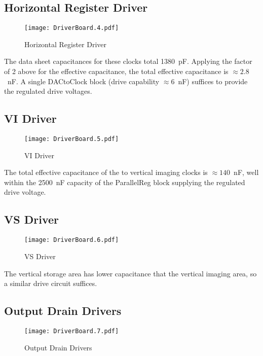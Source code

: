 \subsection{Horizontal Register Driver}
   \begin{figure}
   \begin{center}
   \texttt{[image: DriverBoard.4.pdf]}
   \end{center}
   \caption{Horizontal Register Driver}
   \end{figure}
   
The data sheet capacitances for these clocks total 1380\ pF. Applying the factor of 2 above for the effective capacitance, the total effective capacitance is $\approx 2.8$\ nF. A single DACtoClock block (drive capability $\approx 6$\ nF) suffices to provide the regulated drive voltages.
  


\subsection{VI Driver}
   \begin{figure}
   \begin{center}
   \texttt{[image: DriverBoard.5.pdf]}
   \end{center}
   \caption{VI Driver}
   \end{figure}

The total effective capacitance of the to vertical imaging clocks is $\approx 140$\ nF, well within the 2500\ nF capacity of the ParallelReg block supplying the regulated drive voltage.


\subsection{VS Driver}
   \begin{figure}
   \begin{center}
   \texttt{[image: DriverBoard.6.pdf]}
   \end{center}
   \caption{VS Driver}
   \end{figure}

The vertical storage area has lower capacitance that the vertical imaging area, so a similar drive circuit suffices.


\subsection{Output Drain Drivers}
   \begin{figure}
   \begin{center}
   \texttt{[image: DriverBoard.7.pdf]}
   \end{center}
   \caption{Output Drain Drivers}
   \end{figure}

